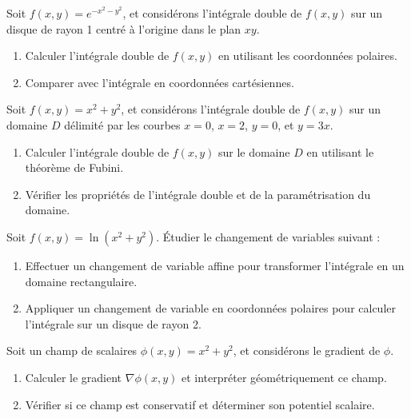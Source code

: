 \begin{exercice}
Soit \( f(x, y) = e^{-x^2 - y^2} \), et considérons l'intégrale double de \( f(x, y) \) sur un disque de rayon 1 centré à l'origine dans le plan \( xy \).
\begin{enumerate}
    \item Calculer l'intégrale double de \( f(x, y) \) en utilisant les coordonnées polaires.
    \item Comparer avec l'intégrale en coordonnées cartésiennes.
\end{enumerate}
\end{exercice}

\begin{exercice}
Soit \( f(x, y) = x^2 + y^2 \), et considérons l'intégrale double de \( f(x, y) \) sur un domaine \( D \) délimité par les courbes \( x = 0 \), \( x = 2 \), \( y = 0 \), et \( y = 3x \).
\begin{enumerate}
    \item Calculer l'intégrale double de \( f(x, y) \) sur le domaine \( D \) en utilisant le théorème de Fubini.
    \item Vérifier les propriétés de l'intégrale double et de la paramétrisation du domaine.
\end{enumerate}
\end{exercice}

\begin{exercice}
Soit \( f(x, y) = \ln(x^2 + y^2) \). Étudier le changement de variables suivant :
\begin{enumerate}
    \item Effectuer un changement de variable affine pour transformer l'intégrale en un domaine rectangulaire.
    \item Appliquer un changement de variable en coordonnées polaires pour calculer l'intégrale sur un disque de rayon 2.
\end{enumerate}
\end{exercice}

\begin{exercice}
Soit un champ de scalaires \( \phi(x, y) = x^2 + y^2 \), et considérons le gradient de \( \phi \).
\begin{enumerate}
    \item Calculer le gradient \( \nabla \phi(x, y) \) et interpréter géométriquement ce champ.
    \item Vérifier si ce champ est conservatif et déterminer son potentiel scalaire.
\end{enumerate}
\end{exercice}

